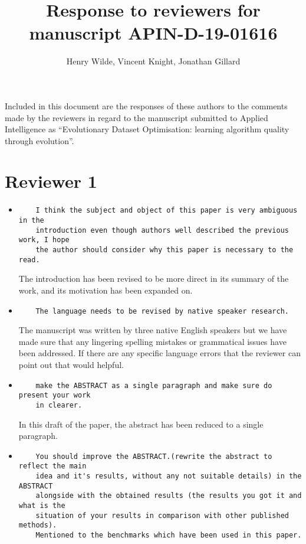 \documentclass[11pt]{article}
\title{Response to reviewers for manuscript APIN-D-19-01616}
\author{Henry Wilde, Vincent Knight, Jonathan Gillard}
\date{}
\begin{document}
\maketitle%

Included in this document are the responses of these authors to the comments
made by the reviewers in regard to the manuscript submitted to Applied
Intelligence as ``Evolutionary Dataset Optimisation: learning algorithm quality
through evolution''.

\section*{Reviewer 1}

\begin{itemize}

\item
\begin{verbatim}
    I think the subject and object of this paper is very ambiguous in the
    introduction even though authors well described the previous work, I hope
    the author should consider why this paper is necessary to the read.
\end{verbatim}

The introduction has been revised to be more direct in its summary of the work,
and its motivation has been expanded on.


\item
\begin{verbatim}
    The language needs to be revised by native speaker research.
\end{verbatim}

The manuscript was written by three native English speakers but we have made
sure that any lingering spelling mistakes or grammatical issues have been
addressed. If there are any specific language errors that the reviewer can point
out that would helpful.

\item
\begin{verbatim}
    make the ABSTRACT as a single paragraph and make sure do present your work
    in clearer.
\end{verbatim}

In this draft of the paper, the abstract has been reduced to a single paragraph.

\item
\begin{verbatim}
    You should improve the ABSTRACT.(rewrite the abstract to reflect the main
    idea and it's results, without any not suitable details) in the ABSTRACT
    alongside with the obtained results (the results you got it and what is the
    situation of your results in comparison with other published methods).
    Mentioned to the benchmarks which have been used in this paper.
\end{verbatim}


\end{itemize}
\end{document}
